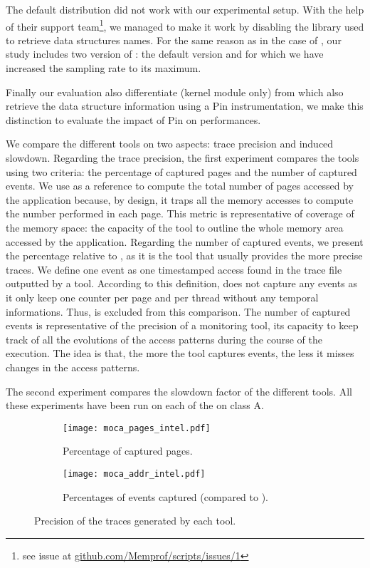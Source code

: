 The default \MemProf distribution did not work with our experimental setup. With the help
of their support team\footnote{see issue at
    \href{https://github.com/Memprof/scripts/issues/1}{github.com/Memprof/scripts/issues/1}}, we managed to make it work by disabling the library used to retrieve
data structures names. For the same reason as in the case of \Mitos, our study includes
two version of \MemProf: the default version and \MemProfTun for which we have
increased the sampling rate to its maximum.

Finally our evaluation also differentiate \Moca (kernel module only) from
\MocaPin which also retrieve the data structure information using a Pin
instrumentation, we make this distinction to evaluate the impact of Pin on
\Moca performances.

We compare the different tools on two aspects: trace precision and induced slowdown. Regarding the trace precision, the first experiment compares the tools
using two criteria:  the
percentage of captured pages and the number of captured events.  We use \TABARNAC as a reference to compute the total number of pages accessed by the
application because, by design, it traps all the memory accesses to compute the number performed in each page. This metric is representative of coverage of the
memory space: the capacity of the tool to outline the whole memory area accessed by the application. Regarding the number of captured events, we present the percentage
relative to \Moca, as it is the tool that usually provides the more precise traces. We define one event as one
timestamped access found in the trace file outputted by a tool. According to this definition, \TABARNAC does not capture any events as it only keep one
counter per page and per thread without any temporal informations. Thus, \TABARNAC is excluded from this comparison. The number of captured events is representative
of the precision of a monitoring tool, its capacity to keep track of all the evolutions of the access patterns during the course of the execution. The idea is
that, the more the tool captures events, the less it misses changes in the access patterns.

The second experiment compares the
slowdown factor of the different tools.  All these experiments have been run on each of the \NPB on class A.

\begin{figure}[htb]
    \centering
    \begin{subfigure}{\linewidth}
        \texttt{[image: moca\_pages\_intel.pdf]}
        \caption{Percentage of captured pages.}
        \label{fig:pages}
    \end{subfigure}
    \begin{subfigure}{\linewidth}
        \texttt{[image: moca\_addr\_intel.pdf]}
        \caption{Percentages of events captured (compared to \Moca).}
        \label{fig:addr}
    \end{subfigure}
    \caption{Precision of the traces generated by each tool.}
    \label{fig:pages-addr}
\end{figure}

